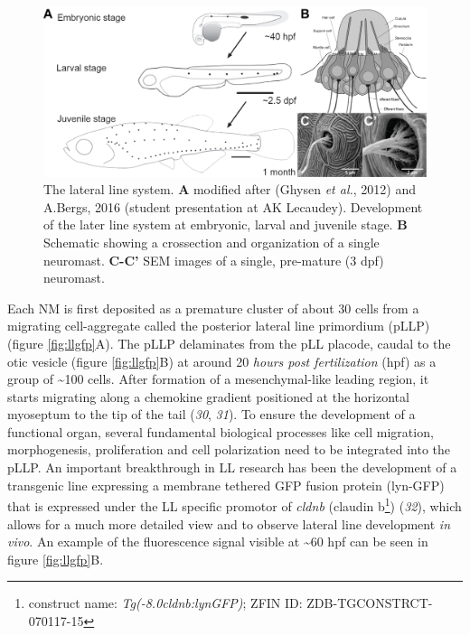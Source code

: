 \documentclass[11pt,singlespacinge,twoside]{reedthesis} %
\theoremstyle{definition}
\theoremstyle{definition}
\theoremstyle{definition}
\theoremstyle{remark}
\begin{document}
\begin{figure}

{\centering \includegraphics[width=0.85\linewidth]{figures/intro/ll_system} 

}

\caption[The lateral line system]{The lateral line system. \textbf{A} modified after (Ghysen \emph{et al.}, 2012) and A.Bergs, 2016 (student presentation at AK Lecaudey). Development of the later line system at embryonic, larval and juvenile stage. \textbf{B} Schematic showing a crossection and organization of a single neuromast. \textbf{C-C'} SEM images of a single, pre-mature (3 dpf) neuromast.}\label{fig:llsystem}
\end{figure}
Each NM is first deposited as a premature cluster of about 30 cells from a migrating cell-aggregate called the posterior lateral line primordium (pLLP) (figure \ref{fig:llgfp}A). The pLLP delaminates from the pLL placode, caudal to the otic vesicle (figure \ref{fig:llgfp}B) at around 20 \emph{hours post fertilization} (hpf) as a group of \textasciitilde100 cells. After formation of a mesenchymal-like leading region, it starts migrating along a chemokine gradient positioned at the horizontal myoseptum to the tip of the tail (\emph{30}, \emph{31}). To ensure the development of a functional organ, several fundamental biological processes like cell migration, morphogenesis, proliferation and cell polarization need to be integrated into the pLLP.
An important breakthrough in LL research has been the development of a transgenic line expressing a membrane tethered GFP fusion protein (lyn-GFP) that is expressed under the LL specific promotor of \emph{cldnb} (claudin b\footnote{construct name: \emph{Tg(-8.0cldnb:lynGFP)}; ZFIN ID: ZDB-TGCONSTRCT-070117-15}) (\emph{32}), which allows for a much more detailed view and to observe lateral line development \emph{in vivo}. An example of the fluorescence signal visible at \textasciitilde60 hpf can be seen in figure \ref{fig:llgfp}B.
\end{document}
